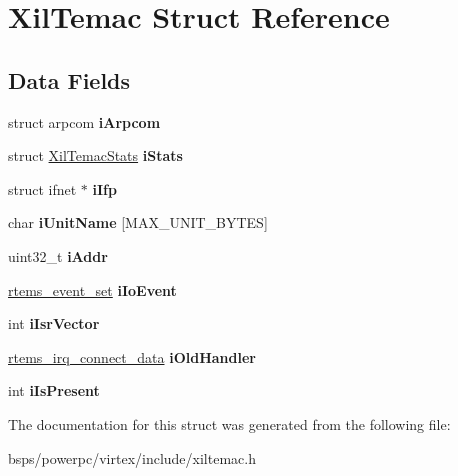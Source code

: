\hypertarget{structXilTemac}{}\section{Xil\+Temac Struct Reference}
\label{structXilTemac}
\subsection*{Data Fields}
\begin{DoxyCompactItemize}
\item 
\mbox{\label{structXilTemac_a6da39db3c8a0c44ab70d66d6c9f393b0}} 
struct arpcom {\bfseries i\+Arpcom}
\item 
\mbox{\label{structXilTemac_a4b7c0554e7ddf71f5f004627dc1d5209}} 
struct \mbox{\hyperlink{structXilTemacStats}{Xil\+Temac\+Stats}} {\bfseries i\+Stats}
\item 
\mbox{\label{structXilTemac_aeba43dfe0ddb1949d8492670a22a1161}} 
struct ifnet $\ast$ {\bfseries i\+Ifp}
\item 
\mbox{\label{structXilTemac_acd47823644c0525e3ed1cd409baa1d0c}} 
char {\bfseries i\+Unit\+Name} \mbox{[}M\+A\+X\+\_\+\+U\+N\+I\+T\+\_\+\+B\+Y\+T\+ES\mbox{]}
\item 
\mbox{\label{structXilTemac_af12aa485323fbf56dadaeb98901a0f19}} 
uint32\+\_\+t {\bfseries i\+Addr}
\item 
\mbox{\label{structXilTemac_a9489aaa39213c212048589baa29b6923}} 
\mbox{\hyperlink{group__ClassicEventSet_gab7b8f373bea85fd4e3b7ae23905faa07}{rtems\+\_\+event\+\_\+set}} {\bfseries i\+Io\+Event}
\item 
\mbox{\label{structXilTemac_ae3a072e9da48ad09f9fde4a9306cc5c1}} 
int {\bfseries i\+Isr\+Vector}
\item 
\mbox{\label{structXilTemac_a5f187e96a0155482015244ee913ad463}} 
\mbox{\hyperlink{struct____rtems__irq__connect__data____}{rtems\+\_\+irq\+\_\+connect\+\_\+data}} {\bfseries i\+Old\+Handler}
\item 
\mbox{\label{structXilTemac_ad3d56bc46dbdf30c2be95ae060e860c3}} 
int {\bfseries i\+Is\+Present}
\end{DoxyCompactItemize}


The documentation for this struct was generated from the following file\+:\begin{DoxyCompactItemize}
\item 
bsps/powerpc/virtex/include/xiltemac.\+h\end{DoxyCompactItemize}

